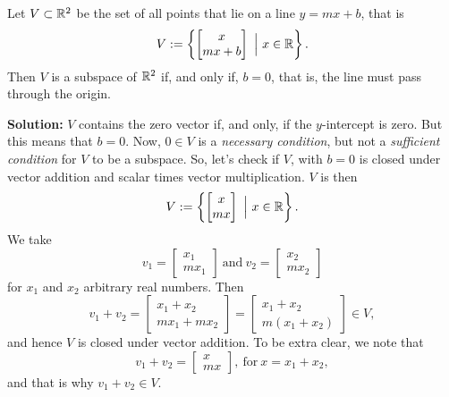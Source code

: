 \begin{example}
\label{ex:Subspace01}
Let $V\subset \mathbb R^2$ be the set of all points that lie on a line $y=mx+b$, that is
$$V:=\left\{ \begin{bmatrix} x \\ m x + b\end{bmatrix}~ \Big| ~ x \in \mathbb R \right\}. $$ Then $V$ is a subspace of $\mathbb R^2$ if, and only if, $b=0$, that is, the line must pass through the origin.
\end{example}




\textbf{Solution:} 
$V$ contains the zero vector if, and only, if the $y$-intercept is zero. But this means that $b=0$. Now, $0 \in V$ is a \textit{necessary condition}, but not a \textit{sufficient condition} for $V$ to be a subspace. So, let's check if $V$, with $b=0$ is closed under vector addition and scalar times vector multiplication. $V$ is then
$$V:=\left\{ \begin{bmatrix} x \\ m x\end{bmatrix}~ \Big| ~ x \in \mathbb R \right\}.$$
We take 
$$v_1 = \begin{bmatrix} x_1 \\ m x_1 \end{bmatrix}~\text{and}~v_2 = \begin{bmatrix} x_2 \\ m x_2 \end{bmatrix} $$
for $x_1$ and $x_2$ arbitrary real numbers. Then
$$v_1 + v_2= \begin{bmatrix} x_1 + x_2 \\ m x_1 + m x_2 \end{bmatrix}=\begin{bmatrix} x_1 + x_2 \\ m (x_1 + x_2) \end{bmatrix} \in V,$$
and hence $V$ is closed under vector addition. To be extra clear, we note that
$$v_1 + v_2= \begin{bmatrix} x \\ m x \end{bmatrix}, ~\text{for}~x=x_1 + x_2,$$
and that is why $v_1 + v_2 \in V.$\\


